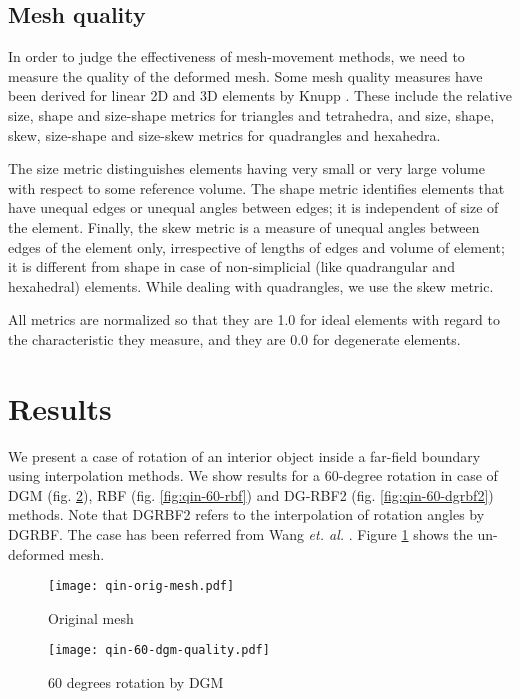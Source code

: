 \documentclass[11pt, ms, onehalfspacing]{ncsuthesis}
\begin{document}
\subsection{Mesh quality}

In order to judge the effectiveness of mesh-movement methods, we need to measure the quality of the deformed mesh. Some mesh quality measures have been derived for linear 2D and 3D elements by Knupp \cite{qualknupp}. These include the relative size, shape and size-shape metrics for triangles and tetrahedra, and size, shape, skew, size-shape and size-skew metrics for quadrangles and hexahedra.

The size metric distinguishes elements having very small or very large volume with respect to some reference volume. The shape metric identifies elements that have unequal edges or unequal angles between edges; it is independent of size of the element. Finally, the skew metric is a measure of unequal angles between edges of the element only, irrespective of lengths of edges and volume of element; it is different from shape in case of non-simplicial (like quadrangular and hexahedral) elements. While dealing with quadrangles, we use the skew metric.

All metrics are normalized so that they are 1.0 for ideal elements with regard to the characteristic they measure, and they are 0.0 for degenerate elements. 

\section{Results}
We present a case of rotation of an interior object inside a far-field boundary using interpolation methods. We show results for a 60-degree rotation in case of DGM (fig. \ref{fig:qin-60-dgm}), RBF (fig. \ref{fig:qin-60-rbf}) and DG-RBF2 (fig. \ref{fig:qin-60-dgrbf2}) methods. Note that DGRBF2 refers to the interpolation of rotation angles by DGRBF. The case has been referred from Wang \emph{et. al.} \cite{mm:dgrbf}. Figure \ref{fig:qin-orig} shows the un-deformed mesh.

\begin{figure}
	\centering
	\texttt{[image: qin-orig-mesh.pdf]}
	\caption{Original mesh}
	\label{fig:qin-orig}
\end{figure}

\begin{figure}
	\centering
	\texttt{[image: qin-60-dgm-quality.pdf]}
	\caption{60 degrees rotation by DGM}
	\label{fig:qin-60-dgm}
\end{figure}
\end{document}
